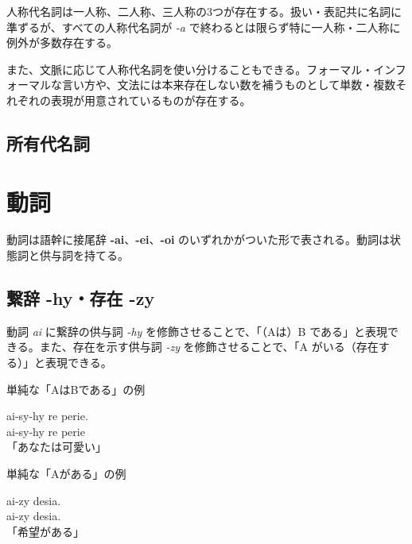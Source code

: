 人称代名詞は一人称、二人称、三人称の3つが存在する。扱い・表記共に名詞に準ずるが、すべての人称代名詞が \emph{-a} で終わるとは限らず特に一人称・二人称に例外が多数存在する。

また、文脈に応じて人称代名詞を使い分けることもできる。フォーマル・インフォーマルな言い方や、文法には本来存在しない数を補うものとして単数・複数それぞれの表現が用意されているものが存在する。

\subsection{所有代名詞}

\section{動詞}

動詞は語幹に接尾辞 \textbf{-ai}、\textbf{-ei}、\textbf{-oi} のいずれかがついた形で表される。動詞は状態詞と供与詞を持てる。

\subsection{繋辞 -hy・存在 -zy}

動詞 \emph{ai} に繋辞の供与詞 \emph{-hy} を修飾させることで、「（Aは）B である」と表現できる。また、存在を示す供与詞 \emph{-zy} を修飾させることで、「A がいる（存在する）」と表現できる。

\begin{itembox}[l]{単純な「AはBである」の例}
    \begin{pindent}
        \noindent
        ai-sy-hy re perie. \\
        ai-sy-hy
            re perie \\
        「あなたは可愛い」
    \end{pindent}
\end{itembox}

\begin{itembox}[l]{単純な「Aがある」の例}
    \begin{pindent}
        \noindent
        ai-zy desia. \\
        ai-zy desia.\\
        「希望がある」
    \end{pindent}
\end{itembox}

